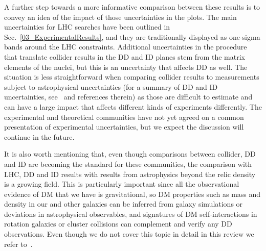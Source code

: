 A further step towards a more informative comparison between these results is to convey an idea of the impact of those uncertainties in the plots. 
The main uncertainties for LHC searches have been outlined in Sec.~\ref{03_ExperimentalResults}, and they are traditionally displayed as one-sigma bands around the LHC constraints. 
Additional uncertainties in the procedure that translate collider results in the DD and ID planes stem from the matrix elements of the nuclei, but this is an uncertainty that
affects DD as well. %
The situation is less straightforward when comparing collider results to measurements subject to astrophysical uncertainties (for a summary of DD and ID uncertainties, see~\cite{Feldstein:2014ufa,d300ef23986a49099715e661295a4d72} and references therein) as those are difficult to estimate and can have a large impact that affects different kinds of experiments differently. 
The experimental and theoretical communities have not yet agreed on a common presentation of experimental uncertainties, but we expect the discussion will continue in the future. 


It is also worth mentioning that, even though comparisons between collider, DD and ID are becoming the standard for these communities,
the comparison with LHC, DD and ID results with results from astrophysics beyond the relic density is a growing field. 
This is particularly important since all the observational evidence of DM that we have is gravitational,
so DM properties such as mass and density in our and other galaxies
can be inferred from galaxy simulations or deviations in astrophysical observables, 
and signatures of DM self-interactions in rotation galaxies or cluster collisions can complement and verify any DD 
observations. Even though we do not cover this topic in detail in this review we refer to~\cite{Buckley:2017ijx}. 